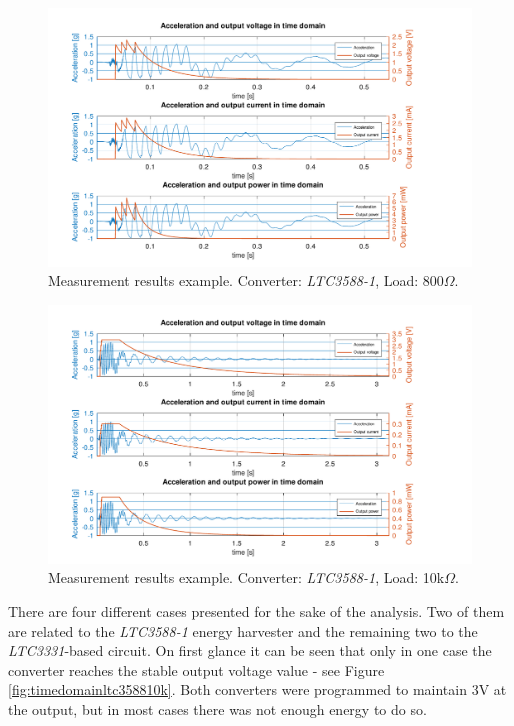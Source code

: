 \documentclass[12pt,a4paper]{article}
\begin{document}
\begin{landscape} 
\begin{figure}[ht!]
\includegraphics[scale=1.05]{timedomainltc3331800.pdf}
\caption{Measurement results example. Converter: \textit{LTC3588-1}, Load: 800$\Omega$.}
\label{fig:timedomainltc3331800}
\end{figure}
\end{landscape}

\begin{landscape} 
\begin{figure}[ht!]
\includegraphics[scale=1.05]{timedomainltc333110k.pdf}
\caption{Measurement results example. Converter: \textit{LTC3588-1}, Load: 10k$\Omega$.}
\label{fig:timedomainltc333110k}
\end{figure}
\end{landscape}

There are four different cases presented for the sake of the analysis. Two of them are related to the \textit{LTC3588-1} energy harvester and the remaining two to the \textit{LTC3331}-based circuit. On first glance it can be seen that only in one case the converter reaches the stable output voltage value - see Figure \ref{fig:timedomainltc358810k}. Both converters were programmed to maintain 3V at the output, but in most cases there was not enough energy to do so.
\end{document}
